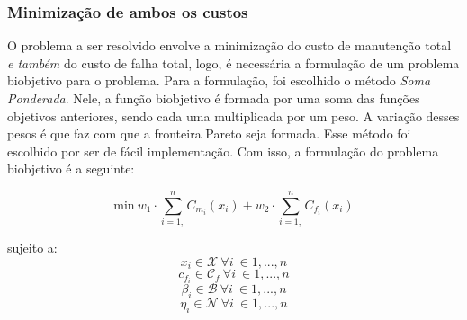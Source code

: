 \subsubsection{Minimização de ambos os custos} O problema a ser resolvido envolve a minimização do custo de manutenção total \emph{e também} do custo de falha total, logo, é necessária a formulação de um problema biobjetivo para o problema. Para a formulação, foi escolhido o método \emph{Soma Ponderada}. Nele, a função biobjetivo é formada por uma soma das funções objetivos anteriores, sendo cada uma multiplicada por um peso. A variação desses pesos é que faz com que a fronteira Pareto seja formada. Esse método foi escolhido por ser de fácil implementação. Com isso, a formulação do problema biobjetivo é a seguinte:

\begin{equation}
\mathrm{min}\ w_1 \cdot \sum_{i=1,}^{n} C_{m_i} (x_i) + w_2 \cdot \sum_{i=1,}^{n} C_{f_i} (x_i) 
\label{sum_biobj}
\end{equation}

sujeito a:
\begin{equation}
x_i \in \mathcal{X}\ \forall i\ \in 1, ..., n
\label{rest1_biobj}
\end{equation}
\begin{equation}
c_{f_i} \in \mathcal{C}_{f}\ \forall i\ \in 1, ..., n
\label{rest2_biobj}
\end{equation}
\begin{equation}
\beta_{i} \in \mathcal{B}\ \forall i\ \in 1, ..., n
\label{rest3_biobj}
\end{equation}
\begin{equation}
\eta_{i} \in \mathcal{N}\ \forall i\ \in 1, ..., n
\label{rest4_biobj}
\end{equation}